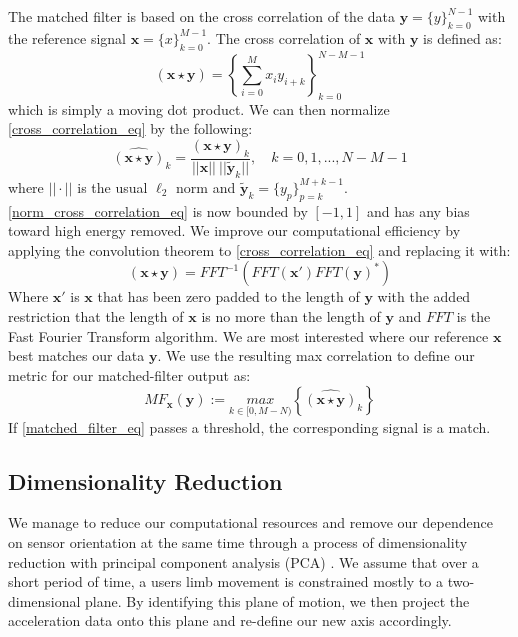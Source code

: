 \documentclass[journal]{IEEEtran}
\begin{document}
The matched filter is based on the cross correlation of the data $\textbf{y} = \{y\}_{k=0}^{N-1}$ with the reference signal $\textbf{x} = \{x\}_{k=0}^{M-1}$.
The cross correlation of $\textbf{x}$ with $\textbf{y}$ is defined as:
%
\begin{equation} \label{cross_correlation_eq}
(\textbf{x} \star \textbf{y}) = \left \{\sum_{i=0}^{M}x_{i} y_{i+k} \right \}_{k=0}^{N-M-1}
\end{equation}
%
which is simply a moving dot product.
We can then normalize \eqref{cross_correlation_eq} by the following:
%
\begin{equation} \label{norm_cross_correlation_eq}
\widehat{(\textbf{x} \star \textbf{y})}_k = \frac{(\textbf{x} \star \textbf{y})_k}{||\textbf{x}|| \ || \widetilde{\textbf{y}}_k || }, \quad k = 0,1,...,N-M-1
\end{equation}
%
where $|| \cdot ||$ is the usual $\ell_2$ norm and $\widetilde{\textbf{y}}_k = \{y_p\}_{p=k}^{M+k-1}$.
\eqref{norm_cross_correlation_eq} is now bounded by $[-1,1]$ and has any bias toward high energy removed.
We improve our computational efficiency by applying the convolution theorem to \eqref{cross_correlation_eq} and replacing it with:
%
\begin{equation} \label{conv_theorem}
(\textbf{x} \star \textbf{y}) = FFT^{-1}(FFT(\textbf{x}') FFT(\textbf{y})^*)
\end{equation}
%
Where $\textbf{x}'$ is $\textbf{x}$ that has been zero padded to the length of $\textbf{y}$ with the added restriction that the length of $\textbf{x}$ is no more than the length of $\textbf{y}$ and $FFT$ is the Fast Fourier Transform algorithm.
We are most interested where our reference $\textbf{x}$ best matches our data $\textbf{y}$.
We use the resulting max correlation to define our metric for  our matched-filter output as:
%
\begin{equation} \label{matched_filter_eq}
MF_{\textbf{x}}(\textbf{y}) := \underset{k \in [0, M-N)}{max} \left \{\widehat{(\textbf{x} \star \textbf{y})}_k \right \}
\end{equation}
%
If \eqref{matched_filter_eq} passes a threshold, the corresponding signal is a match.
%
\subsection{Dimensionality Reduction}
We manage to reduce our computational resources and remove our dependence on sensor orientation at the same time through a process of dimensionality reduction with principal component analysis (PCA) \cite{bishop_2006}.
We assume that over a short period of time, a user\textquotesingle s limb movement is constrained mostly to a two-dimensional plane.
By identifying this plane of motion, we then project the acceleration data onto this plane and re-define our new axis accordingly.
\end{document}
